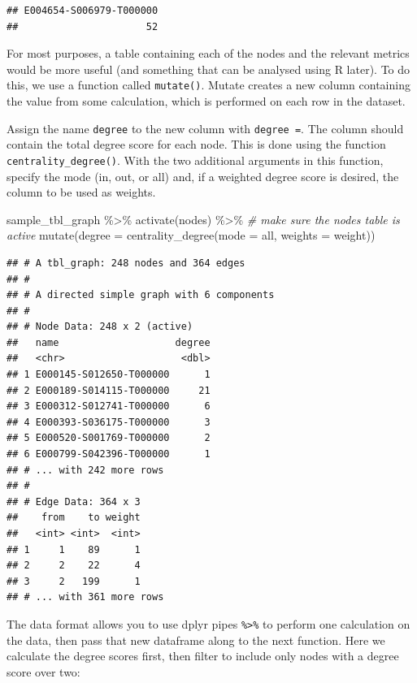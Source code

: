 \documentclass[
]{book}
\newenvironment{Shaded}{\begin{snugshade}}{\end{snugshade}}
\newcommand{\AttributeTok}[1]{\textcolor[rgb]{0.77,0.63,0.00}{#1}}
\newcommand{\CommentTok}[1]{\textcolor[rgb]{0.56,0.35,0.01}{\textit{#1}}}
\newcommand{\FunctionTok}[1]{\textcolor[rgb]{0.00,0.00,0.00}{#1}}
\newcommand{\NormalTok}[1]{#1}
\newcommand{\SpecialCharTok}[1]{\textcolor[rgb]{0.00,0.00,0.00}{#1}}
\newcommand{\StringTok}[1]{\textcolor[rgb]{0.31,0.60,0.02}{#1}}
\begin{document}
\begin{verbatim}
## E004654-S006979-T000000 
##                      52
\end{verbatim}

For most purposes, a table containing each of the nodes and the relevant metrics would be more useful (and something that can be analysed using R later). To do this, we use a function called \texttt{mutate()}. Mutate creates a new column containing the value from some calculation, which is performed on each row in the dataset.

Assign the name \texttt{degree} to the new column with \texttt{degree\ =}. The column should contain the total degree score for each node. This is done using the function \texttt{centrality\_degree()}. With the two additional arguments in this function, specify the mode (in, out, or all) and, if a weighted degree score is desired, the column to be used as weights.

\begin{Shaded}
\begin{Highlighting}[]
\NormalTok{sample\_tbl\_graph }\SpecialCharTok{\%\textgreater{}\%} 
  \FunctionTok{activate}\NormalTok{(nodes) }\SpecialCharTok{\%\textgreater{}\%} \CommentTok{\# make sure the nodes table is active}
  \FunctionTok{mutate}\NormalTok{(}\AttributeTok{degree =} \FunctionTok{centrality\_degree}\NormalTok{(}\AttributeTok{mode =} \StringTok{\textquotesingle{}all\textquotesingle{}}\NormalTok{, }\AttributeTok{weights =}\NormalTok{ weight))}
\end{Highlighting}
\end{Shaded}

\begin{verbatim}
## # A tbl_graph: 248 nodes and 364 edges
## #
## # A directed simple graph with 6 components
## #
## # Node Data: 248 x 2 (active)
##   name                    degree
##   <chr>                    <dbl>
## 1 E000145-S012650-T000000      1
## 2 E000189-S014115-T000000     21
## 3 E000312-S012741-T000000      6
## 4 E000393-S036175-T000000      3
## 5 E000520-S001769-T000000      2
## 6 E000799-S042396-T000000      1
## # ... with 242 more rows
## #
## # Edge Data: 364 x 3
##    from    to weight
##   <int> <int>  <int>
## 1     1    89      1
## 2     2    22      4
## 3     2   199      1
## # ... with 361 more rows
\end{verbatim}

The data format allows you to use dplyr pipes \texttt{\%\textgreater{}\%} to perform one calculation on the data, then pass that new dataframe along to the next function. Here we calculate the degree scores first, then filter to include only nodes with a degree score over two:
\end{document}
